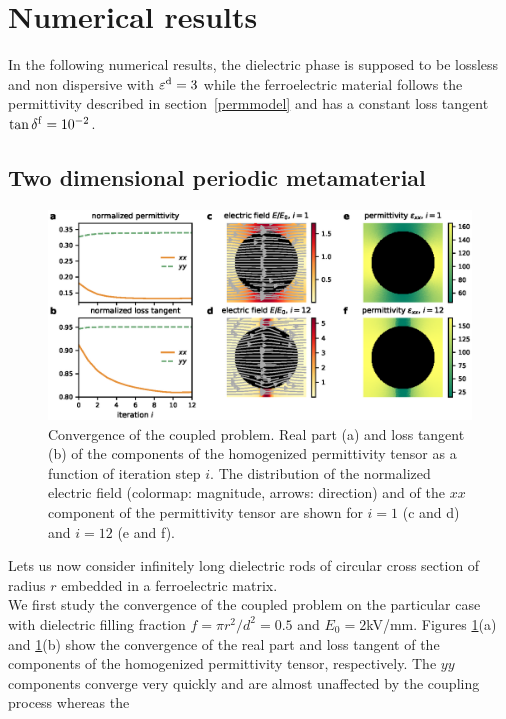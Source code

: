 \documentclass[openacc]{rsproca_new}%
\newcommand{\epsd}{\varepsilon^{\rm d}}
\begin{document}
\section{Numerical results}
In the following numerical results, the dielectric phase is supposed to be
lossless and non dispersive with $\epsd = 3$ while the ferroelectric material follows the
permittivity described in section~\ref{permmodel} and has a constant loss
tangent $\tan \delta^{\rm f} = 10^{-2}$.



\subsection{Two dimensional periodic metamaterial}
\begin{figure}[!t]
\centering
\includegraphics[width=1\textwidth]{conv_per}
\caption{Convergence of the coupled problem.
Real part (a) and loss tangent (b) of the components of the homogenized
 permittivity tensor as a function of iteration step $i$. The distribution of
 the normalized electric field (colormap: magnitude, arrows: direction) and of the
 $xx$ component of the permittivity tensor are shown for $i=1$
  (c and d) and $i=12$ (e and f).
 }
\label{conv2D}
\end{figure}
Lets us now consider infinitely long dielectric rods of circular cross section
of radius $r$ embedded in a ferroelectric matrix.\\
We first study the convergence of the coupled problem on the particular case with dielectric
filling fraction $f=\pi r^2/d^2=0.5$ and $E_0=2$kV/mm. Figures \ref{conv2D}(a) and \ref{conv2D}(b) show the
convergence of the real part and loss tangent of the components of the homogenized
 permittivity tensor, respectively. The $yy$ components converge very quickly
 and are almost unaffected by the coupling process whereas the
\end{document}
